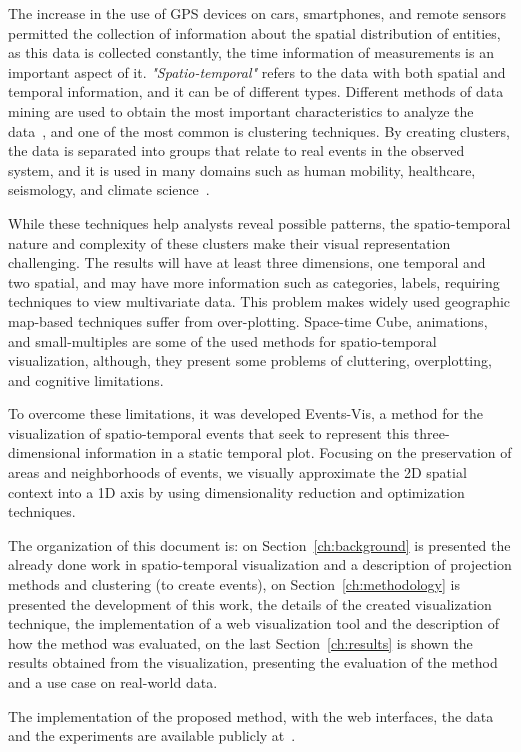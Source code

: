 The increase in the use of GPS devices on cars, smartphones, and remote sensors permitted the collection of information about the spatial distribution of entities,
%
as this data is collected constantly, the time information of measurements is an important aspect of it.
%
\textit{"Spatio-temporal"} refers to the data with both spatial and temporal information, and it can be of different types.
%
Different methods of data mining are used to obtain the most important characteristics to analyze the data~\cite{ansari2020spatiotemporal}, and one of the most common is clustering techniques.
%
By creating clusters, the data is separated into groups that relate to real events in the observed system, and it is used in many domains such as human mobility, healthcare, seismology, and climate science~\cite{BELHADI2020103857}. 
%

While these techniques help analysts reveal possible patterns, the spatio-temporal nature and complexity of these clusters make their visual representation challenging. 
%
The results will have at least three dimensions, one temporal and two spatial, and may have more information such as categories, labels, requiring techniques to view multivariate data. 
%
This problem makes widely used geographic map-based techniques suffer from over-plotting. 
%
Space-time Cube, animations, and small-multiples are some of the used methods for spatio-temporal visualization, although, they present some problems of cluttering, overplotting, and cognitive limitations. 

To overcome these limitations, it was developed Events-Vis, a method for the visualization of spatio-temporal events that seek to represent this three-dimensional information in a static temporal plot.
%
Focusing on the preservation of areas and neighborhoods of events, we visually approximate the 2D spatial context into a 1D axis by using dimensionality reduction and optimization techniques. 

The organization of this document is: on Section~\ref{ch:background} is presented the already done work in spatio-temporal visualization and a description of projection methods and clustering (to create events), on Section~\ref{ch:methodology} is presented the development of this work, the details of the created visualization technique, the implementation of a web visualization tool and the description of how the method was evaluated, on the last Section~\ref{ch:results} is shown the results obtained from the visualization, presenting the evaluation of the method and a use case on real-world data.

The implementation of the proposed method, with the web interfaces, the data and the experiments are available publicly at~\cite{Giovani2021}.